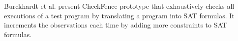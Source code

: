 Burckhardt et al. present CheckFence prototype \cite{DBLP:conf/pldi/BurckhardtAM07} that exhaustively checks all executions of a test program by translating a program into SAT formulas. It increments the observations each time by adding more constraints to SAT formulas. 
